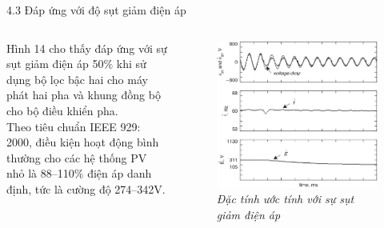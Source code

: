 \documentclass[11pt]{beamer}
\renewcommand{\label}[1]{%
			\gdef\sfname{sf:##1}}%
\begin{document}
\begin{frame}[t]{4.3 Đáp ứng với độ sụt giảm điện áp}
	\begin{columns}
			\justifying
			Hình 14 cho thấy đáp ứng với sự sụt giảm điện áp 50$\%$ khi sử dụng bộ lọc bậc hai cho máy phát hai pha và khung đồng bộ cho bộ điều khiển pha.\\[8pt]
			Theo tiêu chuẩn IEEE 929: 2000, điều kiện hoạt động bình thường cho các hệ thống PV nhỏ là 88–110$\%$ điện áp danh định, tức là cường độ 274–342V.
		\centering
			\begin{figure}[h]
				\includegraphics[width=1\textwidth]{Fig. 14 Estimation characteristics with voltage drop.PNG}
				\caption{\centering \textit{Đặc tính ước tính với sự sụt giảm điện áp}}
			\end{figure}
	\end{columns}
	
\end{frame}
\end{document}
